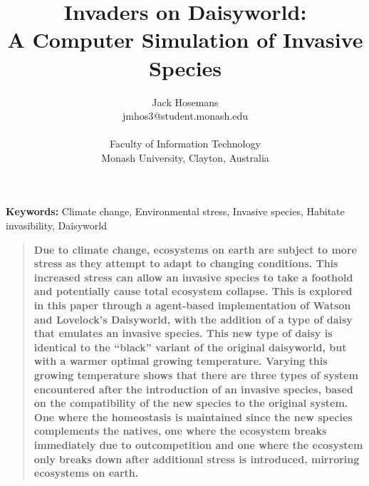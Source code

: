 \documentclass[12pt]{article}
\title{Invaders on Daisyworld:\\ A Computer Simulation of Invasive Species}
\author{
  Jack Hosemans\\
  \normalsize{jmhos3@student.monash.edu}\\
  \\
  \normalsize{Faculty of Information Technology}\\
  \normalsize{Monash University, Clayton, Australia}
}
\date{}
\makeatletter
\renewcommand\paragraph{\@startsection{paragraph}{4}{\z@}%
            {-2.5ex\@plus -1ex \@minus -.25ex}%
            {1.25ex \@plus .25ex}%
            {\normalfont\normalsize\bfseries}}
\newenvironment{sciabstract}{%
\begin{quote} \bf}
{\end{quote}}
\makeatother
\begin{document}
 

\baselineskip24pt


\maketitle 

{\bf \quad Keywords:} Climate change, Environmental stress, Invasive
species, Habitate invasibility, Daisyworld


\begin{sciabstract}
Due to climate change, ecosystems on earth are subject to more stress
as they attempt to adapt to changing conditions. This increased stress
can allow an invasive species to take a foothold and potentially cause
total ecosystem collapse. This is explored in this paper through a
agent-based implementation of Watson and Lovelock's Daisyworld, with
the addition of a type of daisy that emulates an invasive species.
This new type of daisy is identical to the ``black'' variant of the
original daisyworld, but with a warmer optimal growing
temperature. Varying this growing temperature shows that there are
three types of system encountered after the introduction of an
invasive species, based on the compatibility of the new species to the
original system. One where the homeostasis is maintained since the new
species complements the natives, one where the ecosystem breaks
immediately due to outcompetition and one where the ecosystem only
breaks down after additional stress is introduced, mirroring
ecosystems on earth.
\end{sciabstract}



\end{document}
